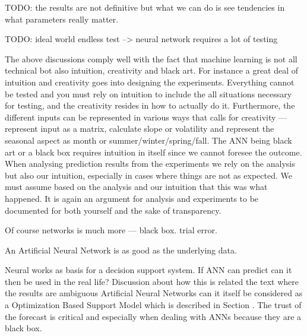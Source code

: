 TODO: the results are not definitive but what we can do is see tendencies in what parameters really matter.

TODO: ideal world endless test --> neural network requires a lot of testing

The above discussions comply well with the fact that machine learning is not all technical bot also intuition, creativity and black art\cite{18}. For instance a great deal of intuition and creativity goes into designing the experiments. Everything cannot be tested and you must rely on intuition to include the all situations necessary for testing, and the creativity resides in how to actually do it. Furthermore, the different inputs can be represented in various ways that calls for creativity --- represent input as a matrix, calculate slope or volatility and represent the seasonal aspect as month or summer/winter/spring/fall. The ANN being black art or a black box requires intuition in itself since we cannot foresee the outcome. When analysing prediction results from the experiments we rely on the analysis but also our intuition, especially in cases where things are not as expected. We must assume based on the analysis and our intuition that this was what happened. It is again an argument for analysis and experiments to be documented for both yourself and the sake of transparency.









Of course networks is much more --- black box. trial error.



An Artificial Neural Network is as good as the underlying data. 



Neural works as basis for a decision support system. If ANN can predict can it then be used in the real life? Discussion about how this is related the text where the results are ambiguous 
Artificial Neural Networks can it itself be considered as a Optimization Based Support Model which is described in Section . The trust of the forecast is critical and especially when dealing with ANNs because they are a black box. 

